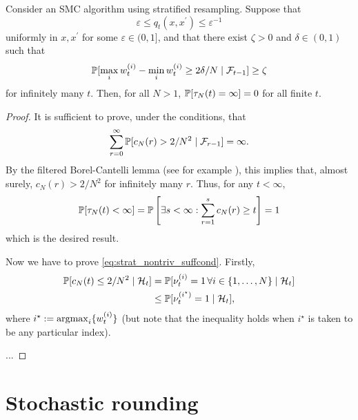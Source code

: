 \begin{lemma}\label{thm:strat_nontriviality}
Consider an SMC algorithm using stratified resampling.
Suppose that 
\begin{equation*}
\varepsilon \leq q_t(x, x^\prime) \leq \varepsilon^{-1}
\end{equation*}
uniformly in $x,x^\prime$ for some $\varepsilon \in (0,1]$, and that there exist $\zeta >0$ and $\delta \in (0,1)$ such that 
\begin{equation*}
\mathbb{P}[ \max_i w_t^{(i)} - \min_i w_t^{(i)} \geq 2\delta/N \mid \mathcal{F}_{t-1} ] \geq \zeta
\end{equation*}
 for infinitely many $t$. Then, for all $N>1$, $\mathbb{P}[ \tau_N(t) = \infty ] =0$ for all finite $t$.
\end{lemma}

\begin{proof}
It is sufficient to prove, under the conditions, that
\begin{equation}\label{eq:strat_nontriv_suffcond}
\sum_{r=0}^\infty \mathbb{P}[ c_N(r) > 2/N^2  \mid \mathcal{F}_{r-1} ] = \infty .
\end{equation}
By the filtered Borel-Cantelli lemma (see for example \cite[Theorem 4.3.4]{durrett2019}), this implies that, almost surely,
$c_N(r) > 2/N^2$ for infinitely many $r$.
Thus, for any $t<\infty$,
\begin{equation}
\mathbb{P}[ \tau_N(t) < \infty ]
= \mathbb{P}\left[ \exists s<\infty : \sum_{r=1}^s c_N(r) \geq t \right]
= 1
\end{equation}
which is the desired result.

Now we have to prove \eqref{eq:strat_nontriv_suffcond}.
Firstly,
\begin{align*}
\mathbb{P}[ c_N(t) \leq 2/N^2 \mid \mathcal{H}_t ]
&= \mathbb{P}[ \nu_t^{(i)} =1 \,\forall i\in\{1,\dots,N\} \mid \mathcal{H}_t ] \\
&\leq \mathbb{P}[ \nu_t^{(i^\star)} =1 \mid \mathcal{H}_t ] ,
\end{align*}
where $i^\star := \operatorname*{argmax}_i \{ w_t^{(i)} \}$ (but note that the inequality holds when $i^\star$ is taken to be any particular index).



...
\end{proof}



\section{Stochastic rounding}


